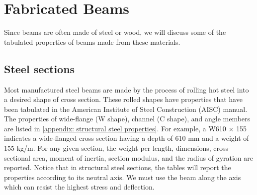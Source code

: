 \documentclass[
10pt,
a4paper,
openany,
svgnames,
]{book}
\begin{document}
\section{Fabricated Beams}

Since beams are often made of steel or wood, we will discuss some of the tabulated properties of beams made from these materials.

\subsection{Steel sections}
Most manufactured steel beams are made by the process of rolling hot steel into a desired shape of cross section. These rolled shapes have properties that have been tabulated in the American Institute of Steel Construction (AISC) manual. The properties of wide-flange (W shape), channel (C shape), and angle members are listed in \cref{appendix: structural steel properties}. For example, a W610 $\times$ 155 indicates a wide-flanged cross section having a depth of 610 mm and a weight of 155 kg/m. For any given section, the weight per length, dimensions, cross-sectional area, moment of inertia, section modulus, and the radius of gyration are reported. Notice that in structural steel sections, the tables will report the properties according to its neutral axis. We must use the beam along the axis which can resist the highest stress and deflection.
\end{document}
